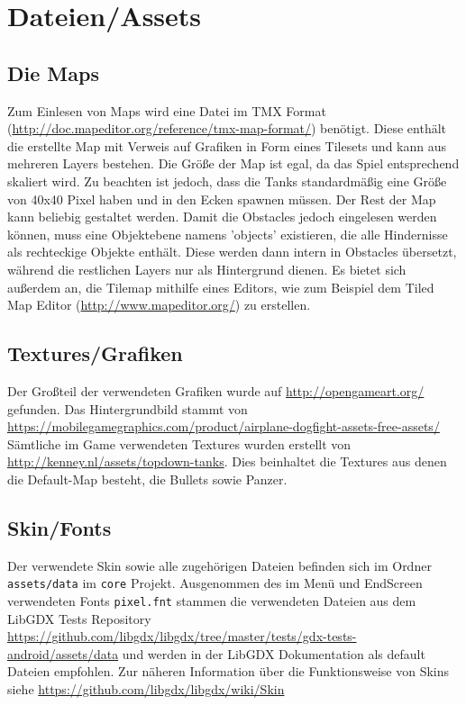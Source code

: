 \documentclass[10pt]{report}
\def\code#1{\texttt{#1}}
\begin{document}
\newpage
\section{Dateien/Assets}
\subsection{Die Maps}
Zum Einlesen von Maps wird eine Datei im TMX Format (\url{http://doc.mapeditor.org/reference/tmx-map-format/}) benötigt. Diese enthält die erstellte Map mit Verweis auf Grafiken in Form eines Tilesets und kann aus mehreren Layers bestehen. Die Größe der Map ist egal, da das Spiel entsprechend skaliert wird. Zu beachten ist jedoch, dass die Tanks standardmäßig eine Größe von 40x40 Pixel haben und in den Ecken spawnen müssen. Der Rest der Map kann beliebig gestaltet werden. Damit die Obstacles jedoch eingelesen werden können, muss eine Objektebene namens 'objects' existieren, die alle Hindernisse als rechteckige Objekte enthält. Diese werden dann intern in Obstacles übersetzt, während die restlichen Layers nur als Hintergrund dienen.
Es bietet sich außerdem an, die Tilemap mithilfe eines Editors, wie zum Beispiel dem Tiled Map Editor (\url{http://www.mapeditor.org/}) zu erstellen.


\subsection{Textures/Grafiken}
Der Großteil der verwendeten Grafiken wurde auf \url{http://opengameart.org/} gefunden.
Das Hintergrundbild stammt von 
\url{https://mobilegamegraphics.com/product/airplane-dogfight-assets-free-assets/}
Sämtliche im Game verwendeten Textures wurden erstellt von \url{http://kenney.nl/assets/topdown-tanks}. Dies beinhaltet die Textures aus denen die Default-Map besteht, die Bullets sowie Panzer.

\subsection{Skin/Fonts}
Der verwendete Skin sowie alle zugehörigen Dateien befinden sich im Ordner \code{assets/data} im \code{core} Projekt. Ausgenommen des im Menü und EndScreen verwendeten Fonts \code{pixel.fnt} stammen die verwendeten Dateien aus dem LibGDX Tests Repository \url{https://github.com/libgdx/libgdx/tree/master/tests/gdx-tests-android/assets/data} und werden in der LibGDX Dokumentation als default Dateien empfohlen. Zur näheren Information über die Funktionsweise von Skins siehe \url{https://github.com/libgdx/libgdx/wiki/Skin}
\end{document}
